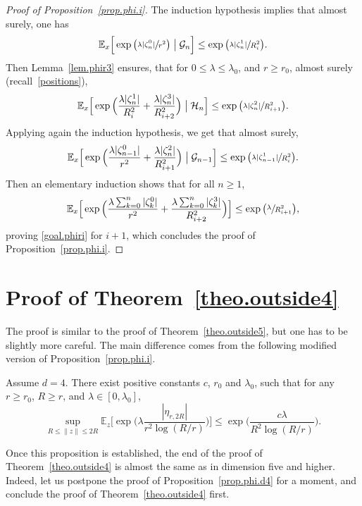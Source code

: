 \begin{proof}[Proof of Proposition~\ref{prop.phi.i}]
The induction hypothesis implies that almost surely, one has
\[
\mathbb E_x\Big[\exp\big(\sfrac{\lambda |\zeta_n^0|}{r^2}\big) \bigm| \mathcal G_n \Big] \le \exp\big(\sfrac{\lambda|\zeta_n^1|}{R_i^2}\big).
\]
Then Lemma~\ref{lem.phir3} ensures,
that for $0\le \lambda \le \lambda_0$, and $r\ge r_0$, almost surely (recall~\eqref{positions}),
\[
\mathbb E_x\Big[\exp\Big(\frac{\lambda |\zeta_n^1|}{R_i^2}+ \frac{\lambda |\zeta^3_n|}{R_{i+2}^2}\Big) \bigm| \mathcal H_n \Big] \le
\exp\big(\sfrac{\lambda |\zeta_n^2|}{R_{i+1}^2}\big).
\]
Applying again the induction hypothesis, we get that almost surely,
\[
\mathbb E_x\Big[\exp\Big(\frac{\lambda |\zeta_{n-1}^0|}{r^2}+ \frac{\lambda |\zeta^2_n|}{R_{i+1}^2}\Big) \bigm| \mathcal G_{n-1} \Big]
\le \exp \big(\sfrac{\lambda |\zeta_{n-1}^1|}{R_i^2}\big).
\]
Then an elementary induction shows that for all $n\ge 1$,
\[
\mathbb E_x\Big[\exp\Big(\frac{\lambda\sum_{k=0}^n |\zeta_k^0|}{r^2}+\frac{\lambda\sum_{k=0}^n |\zeta^3_k|}{R_{i+2}^2}\Big)\Big]
\le \exp\big(\sfrac{\lambda}{R_{i+1}^2}\big),
\]
proving \eqref{goal.phiri} for $i+1$,
which concludes the proof of Proposition~\ref{prop.phi.i}.
\end{proof}

\section{Proof of Theorem~\ref{theo.outside4}}\label{sec-outside4}
The proof is similar to the proof of Theorem~\ref{theo.outside5},
but one has to be slightly more careful.
The main difference comes from the following modified version of Proposition~\ref{prop.phi.i}.

\begin{proposition}\label{prop.phi.d4}
Assume $d=4$. There exist positive constants $c$, $r_0$ and $\lambda_0$, such that for any $r\ge r_0$, $R\ge r$, and $\lambda\in[0,\lambda_0]$,
\[
\sup_{R\le \|z\|\le 2R} \mathbb E_z \Big[\exp\Big(\lambda\frac{|\eta_{r,2R}|}{r^2\log(R/r)}\Big)\Big] \le \exp\Big(\frac{c\lambda}{R^2\log(R/r)}\Big).
\]
\end{proposition}
Once this proposition is established, the end of the proof of Theorem~\ref{theo.outside4} is almost the same as in dimension five and higher. Indeed,
let us postpone the proof of Proposition~\ref{prop.phi.d4} for a moment, and conclude the proof of Theorem~\ref{theo.outside4} first.

